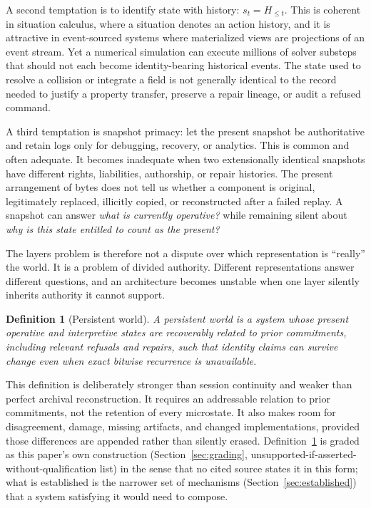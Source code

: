 \documentclass[11pt]{article}
\newtheorem{definition}{Definition}
\begin{document}
A second temptation is to identify state with history: $s_t = H_{\le t}$. This is coherent in situation calculus, where a situation denotes an action history, and it is attractive in event-sourced systems where materialized views are projections of an event stream. Yet a numerical simulation can execute millions of solver substeps that should not each become identity-bearing historical events. The state used to resolve a collision or integrate a field is not generally identical to the record needed to justify a property transfer, preserve a repair lineage, or audit a refused command.

A third temptation is snapshot primacy: let the present snapshot be authoritative and retain logs only for debugging, recovery, or analytics. This is common and often adequate. It becomes inadequate when two extensionally identical snapshots have different rights, liabilities, authorship, or repair histories. The present arrangement of bytes does not tell us whether a component is original, legitimately replaced, illicitly copied, or reconstructed after a failed replay. A snapshot can answer \emph{what is currently operative?} while remaining silent about \emph{why is this state entitled to count as the present?}

The layers problem is therefore not a dispute over which representation is ``really'' the world. It is a problem of divided authority. Different representations answer different questions, and an architecture becomes unstable when one layer silently inherits authority it cannot support.

\begin{definition}[Persistent world]
\label{def:persistent-world}
A persistent world is a system whose present operative and interpretive states are recoverably related to prior commitments, including relevant refusals and repairs, such that identity claims can survive change even when exact bitwise recurrence is unavailable.
\end{definition}

This definition is deliberately stronger than session continuity and weaker than perfect archival reconstruction. It requires an addressable relation to prior commitments, not the retention of every microstate. It also makes room for disagreement, damage, missing artifacts, and changed implementations, provided those differences are appended rather than silently erased. Definition~\ref{def:persistent-world} is graded as this paper's own construction (Section~\ref{sec:grading}, unsupported-if-asserted-without-qualification list) in the sense that no cited source states it in this form; what is established is the narrower set of mechanisms (Section~\ref{sec:established}) that a system satisfying it would need to compose.
\end{document}
